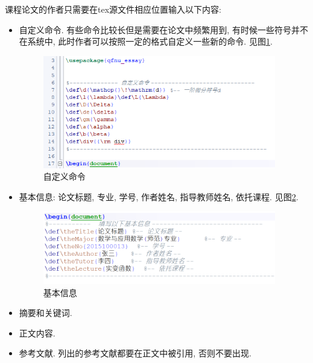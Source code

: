 课程论文的作者只需要在tex源文件相应位置输入以下内容:
\begin{itemize}
  \item 自定义命令. 有些命令比较长但是需要在论文中频繁用到, 有时候一些符号并不在系统中, 此时作者可以按照一定的格式自定义一些新的命令. 见图\ref{pic: redefine}.
        \begin{figure}
          \centering
          \includegraphics[width =4in]{Img/redefine.png}
          \caption{自定义命令}   %
          \label{pic: redefine} %
        \end{figure}
  \item 基本信息: 论文标题, 专业, 学号, 作者姓名, 指导教师姓名, 依托课程. 见图\ref{pic: basic-info}.
        \begin{figure}
          \centering
          \includegraphics[width =4in]{Img/basic-info.png}
          \caption{基本信息}   %
          \label{pic: basic-info} %
        \end{figure}
  \item 摘要和关键词.
  \item 正文内容.
  \item 参考文献. 列出的参考文献都要在正文中被引用, 否则不要出现.
\end{itemize}

